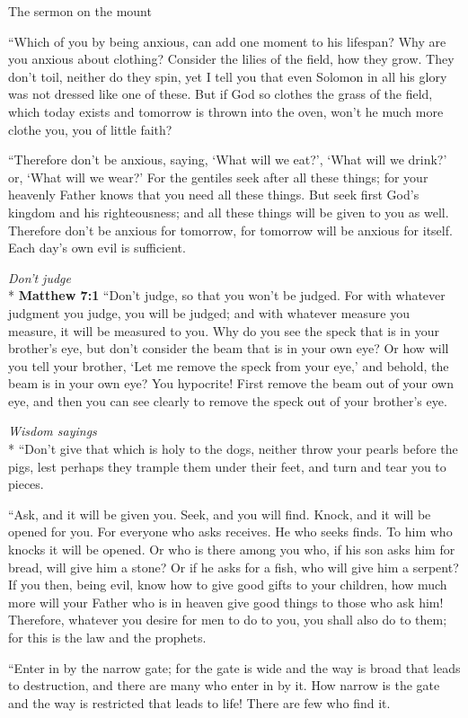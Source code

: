 \documentclass[10pt,twoside]{article} %
\newcommand{\quotesize}{\normalsize{}}
\newenvironment{quotetext}{\begingroup\quotesize}{\endgroup}
\newcommand{\intex}[1]{\index[texts]{#1}}
\newcommand{\bible}[2]{\begin{quotetext}\textbf{#1}\intex{#1} #2\end{quotetext}}
\newcommand{\matthew}[2]{\bible{Matthew #1}{#2}}
\newcommand{\subhead}[1]{\emph{#1}\\*}
\begin{document}
\begin{section}{The sermon on the mount}
{   ``Which of you by being anxious, can add one moment to his lifespan?    Why are you anxious about clothing? Consider the lilies of the field, how they grow. They don't toil, neither do they spin,    yet I tell you that even Solomon in all his glory was not dressed like one of these.    But if God so clothes the grass of the field, which today exists and tomorrow is thrown into the oven, won't he much more clothe you, you of little faith?

   ``Therefore don't be anxious, saying, `What will we eat?', `What will we drink?' or, `What will we wear?'    For the gentiles seek after all these things; for your heavenly Father knows that you need all these things.    But seek first God's kingdom and his righteousness; and all these things will be given to you as well.    Therefore don't be anxious for tomorrow, for tomorrow will be anxious for itself. Each day's own evil is sufficient. 
}

\subhead{Don't judge}
\matthew{7:1}{
    ``Don't judge, so that you won't be judged.    For with whatever judgment you judge, you will be judged; and with whatever measure you measure, it will be measured to you.    Why do you see the speck that is in your brother's eye, but don't consider the beam that is in your own eye?    Or how will you tell your brother, `Let me remove the speck from your eye,' and behold, the beam is in your own eye?    You hypocrite! First remove the beam out of your own eye, and then you can see clearly to remove the speck out of your brother's eye.

\subhead{Wisdom sayings}
   ``Don't give that which is holy to the dogs, neither throw your pearls before the pigs,\label{pearls-before-swine}
 lest perhaps they trample them under their feet, and turn and tear you to pieces.

   ``Ask, and it will be given you. Seek, and you will find. Knock, and it will be opened for you.    For everyone who asks receives. He who seeks finds. To him who knocks it will be opened.    Or who is there among you who, if his son asks him for bread, will give him a stone?    Or if he asks for a fish, who will give him a serpent?    If you then, being evil, know how to give good gifts to your children, how much more will your Father who is in heaven give good things to those who ask him!    Therefore, whatever you desire for men to do to you, you shall also do to them; for this is the law and the prophets.

   ``Enter in by the narrow gate; for the gate is wide and the way is broad that leads to destruction, and there are many who enter in by it.    How narrow is the gate and the way is restricted that leads to life! There are few who find it.

}
\end{section}
\end{document}
